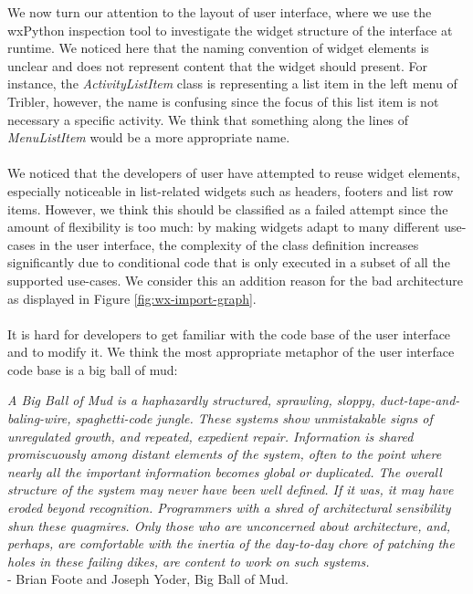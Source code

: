 We now turn our attention to the layout of user interface, where we use the wxPython inspection tool to investigate the widget structure of the interface at runtime. We noticed here that the naming convention of widget elements is unclear and does not represent content that the widget should present. For instance, the \emph{ActivityListItem} class is representing a list item in the left menu of Tribler, however, the name is confusing since the focus of this list item is not necessary a specific activity. We think that something along the lines of \emph{MenuListItem} would be a more appropriate name.\\\\
We noticed that the developers of user have attempted to reuse widget elements, especially noticeable in list-related widgets such as headers, footers and list row items. However, we think this should be classified as a failed attempt since the amount of flexibility is too much: by making widgets adapt to many different use-cases in the user interface, the complexity of the class definition increases significantly due to conditional code that is only executed in a subset of all the supported use-cases. We consider this an addition reason for the bad architecture as displayed in Figure \ref{fig:wx-import-graph}.\\\\
It is hard for developers to get familiar with the code base of the user interface and to modify it. We think the most appropriate metaphor of the user interface code base is a big ball of mud:

\begin{displayquote}
	\emph{A Big Ball of Mud is a haphazardly structured, sprawling, sloppy, duct-tape-and-baling-wire, spaghetti-code jungle. These systems show unmistakable signs of unregulated growth, and repeated, expedient repair. Information is shared promiscuously among distant elements of the system, often to the point where nearly all the important information becomes global or duplicated. The overall structure of the system may never have been well defined. If it was, it may have eroded beyond recognition. Programmers with a shred of architectural sensibility shun these quagmires. Only those who are unconcerned about architecture, and, perhaps, are comfortable with the inertia of the day-to-day chore of patching the holes in these failing dikes, are content to work on such systems.}\\
	- Brian Foote and Joseph Yoder, Big Ball of Mud\cite{foote1997big}.
\end{displayquote}

